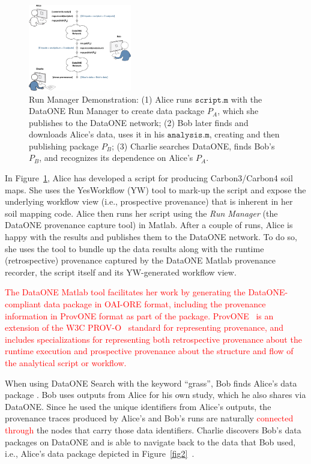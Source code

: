 \documentclass[a4paper]{llncs}
\newcommand{\mytt}[1]{\ensuremath{\mathtt{#1}}}
\begin{document}
\begin{figure}[t] \centering \includegraphics[width=0.4\textwidth]{figs/alice-bob-charlie-sequence-crop} \caption{Run Manager Demonstration: (1) Alice runs \mytt{script.m} with the DataONE Run Manager to create data package $P_A$, which she publishes to the DataONE network; (2) Bob later finds and downloads Alice's data, uses it in his \mytt{analysis.m}, creating and then publishing package $P_B$; (3) Charlie searches DataONE, finds Bob's $P_B$, and recognizes its dependence on Alice's $P_A$.}  \label{fig0} \end{figure}

In Figure~\ref{fig0}, Alice has developed a script for producing Carbon3/Carbon4 soil maps.  She uses the YesWorkflow (YW) tool to mark-up the script and expose the underlying workflow view (i.e., prospective provenance) that is inherent in her soil mapping code. Alice then runs her script using the \emph{Run Manager} (the DataONE provenance capture tool) in Matlab. After a couple of runs, Alice is happy with the results and publishes them to the DataONE network. To do so, she uses the tool to bundle up the data results along with the runtime (retrospective) provenance captured by the DataONE Matlab provenance recorder, the script itself and its YW-generated workflow view.

\textcolor{red}{The DataONE Matlab tool facilitates her work by generating the DataONE-compliant data package in OAI-ORE format, including the provenance information in ProvONE format as part of the package. ProvONE~\cite{provone} is an extension of the W3C PROV-O~\cite{prov-o} standard for representing provenance, and includes specializations for representing both retrospective provenance about the runtime execution and prospective provenance about the structure and flow of the analytical script or workflow.}


When using DataONE Search with the keyword ``grass'', Bob finds Alice's data package \cite{yaxing}. Bob uses outputs from Alice for his own study, which he also shares via DataONE. Since he used the unique identifiers from Alice's outputs, the provenance traces produced by Alice's and Bob's runs are naturally \textcolor{red}{connected through} the nodes that carry those data identifiers. Charlie discovers Bob's data packages on DataONE and is able to navigate back to the data that Bob used, i.e., Alice's data package depicted in Figure~\ref{fig2}~\cite{Katz,data-trajectories}.
\end{document}
